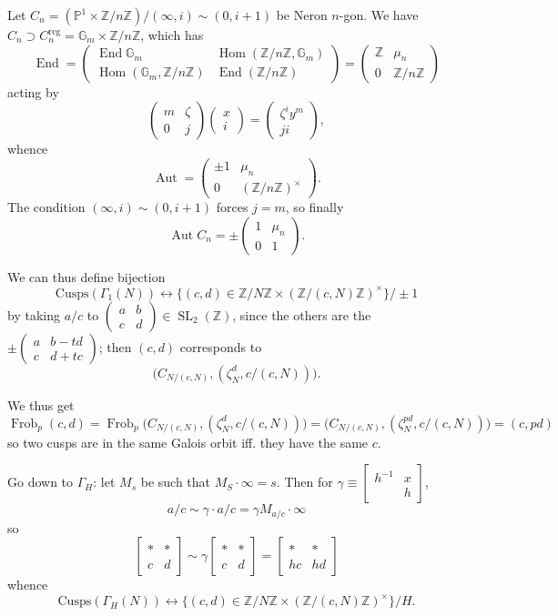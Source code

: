 \documentclass[12pt]{article}
\newcommand{\Z}{\mathbb{Z}}
\renewcommand{\P}{\mathbb{P}}
\newcommand{\G}{\mathbb{G}}
\newcommand{\SL}{\operatorname{SL}}
\newcommand{\Aut}{\operatorname{Aut}}
\newcommand{\Hom}{\operatorname{Hom}}
\newcommand{\End}{\operatorname{End}}
\newcommand{\Frob}{\operatorname{Frob}}
\newcommand{\matabcd}{\left( \begin{smallmatrix} a & b \\ c & d \end{smallmatrix} \right)}
\newcommand{\smat}[4]{\left[ \begin{smallmatrix} #1 & #2 \\ #3 & #4 \end{smallmatrix} \right]}
\theoremstyle{definition}
\begin{document}
Let $C_n = (\P^1 \times \Z/n\Z) / (\infty,i) \sim (0, i+1)$ be Neron $n$-gon. We have $C_n \supset C_n^{\text{reg}} = \G_m \times \Z/n\Z$, which has
\[ \End = \left( \begin{matrix} \End \G_m & \Hom(\Z/n\Z,\G_m) \\ \Hom(\G_m, \Z/n\Z) & \End(\Z/n\Z) \end{matrix} \right) =  \left( \begin{matrix} \Z & \mu_n \\ 0 & \Z/n\Z \end{matrix} \right) \]
acting by 
\[ \left( \begin{matrix} m & \zeta \\ 0 & j \end{matrix} \right) \left( \begin{matrix} x \\ i \end{matrix} \right)= \left( \begin{matrix} \zeta^i y^m \\ ji \end{matrix} \right),  \]
whence
\[ \Aut =  \left( \begin{matrix} \pm1 & \mu_n \\ 0 &( \Z/n\Z )^\times \end{matrix} \right). \]
The condition $(\infty,i) \sim (0, i+1)$ forces $j=m$, so finally
\[ \Aut C_n = \pm \left( \begin{matrix} 1 & \mu_n \\ 0 &1 \end{matrix} \right). \]

We can thus define bijection
\[ \text{Cusps}(\Gamma_1(N)) \longleftrightarrow \{ (c,d) \in \Z/N\Z \times (\Z/(c,N)\Z)^\times \} / \pm 1 \]
by taking $a/c$ to $\matabcd \in \SL_2(\Z)$, since the others are the $\pm \left( \begin{smallmatrix} a & b-td \\ c & d+tc \end{smallmatrix} \right)$; then $(c,d)$ corresponds to
\[ \big( C_{N/(c,N)}, (\zeta_N^d, c/(c,N) ) \big). \]

We thus get
\[ \Frob_p (c,d) = \Frob_p \big( C_{N/(c,N)}, (\zeta_N^d, c/(c,N) ) \big) = \big( C_{N/(c,N)}, (\zeta_N^{pd}, c/(c,N) ) \big) = (c,pd) \]
so two cusps are in the same Galois orbit iff. they have the same $c$.

Go down to $\Gamma_H$: let $M_s$ be such that $M_S \cdot \infty = s$. Then for $\gamma \equiv \smat{h^{-1}}{x}{}{h}$,
\[ a/c \sim \gamma \cdot a/c = \gamma M_{a/c} \cdot \infty \]
so
\[ \smat{*}{*}{c}{d} \sim \gamma \smat{*}{*}{c}{d} = \smat{*}{*}{hc}{hd} \]
whence
\[ \text{Cusps}(\Gamma_H(N)) \longleftrightarrow \{ (c,d) \in \Z/N\Z \times (\Z/(c,N)\Z)^\times \} / H. \]
\end{document}
